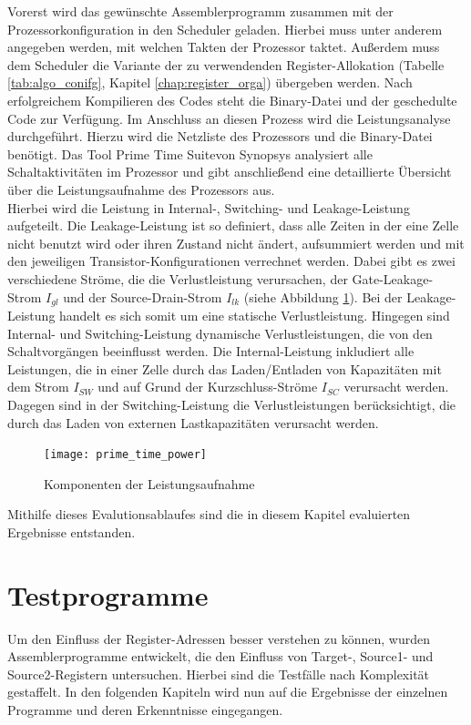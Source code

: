 Vorerst wird das gewünschte Assemblerprogramm zusammen mit der Prozessorkonfiguration in den Scheduler geladen. Hierbei muss unter anderem angegeben werden, mit welchen Takten der Prozessor taktet. Außerdem muss dem Scheduler die Variante der zu verwendenden Register-Allokation (Tabelle \ref{tab:algo_conifg}, Kapitel \ref{chap:register_orga}) übergeben werden. Nach erfolgreichem Kompilieren des Codes steht die Binary-Datei und der geschedulte Code zur Verfügung. Im Anschluss an diesen Prozess wird die Leistungsanalyse durchgeführt. Hierzu wird die Netzliste des Prozessors und die Binary-Datei benötigt. Das Tool \glqq Prime Time Suite\grqq{ }von Synopsys analysiert alle Schaltaktivitäten im Prozessor und gibt anschließend eine detaillierte Übersicht über die Leistungsaufnahme des Prozessors aus.\\
Hierbei wird die Leistung in Internal-, Switching- und Leakage-Leistung aufgeteilt. Die Leakage-Leistung ist so definiert, dass alle Zeiten in der eine Zelle nicht benutzt wird oder ihren Zustand nicht ändert, aufsummiert werden und mit den jeweiligen Transistor-Konfigurationen verrechnet werden. Dabei gibt es zwei verschiedene Ströme, die die Verlustleistung verursachen, der Gate-Leakage-Strom $I_{gl}$ und der Source-Drain-Strom $I_{lk}$ (siehe Abbildung \ref{fig:prime_time_power}). Bei der Leakage-Leistung handelt es sich somit um eine statische Verlustleistung. Hingegen sind Internal- und Switching-Leistung dynamische Verlustleistungen, die von den Schaltvorgängen beeinflusst werden. Die Internal-Leistung inkludiert alle Leistungen, die in einer Zelle durch das Laden/Entladen von Kapazitäten mit dem Strom $I_{SW}$ und auf Grund der Kurzschluss-Ströme $I_{SC}$ verursacht werden. Dagegen sind in der Switching-Leistung die Verlustleistungen berücksichtigt, die durch das Laden von externen Lastkapazitäten verursacht werden.\cite{primeTime2016}
\begin{figure}[H] 
	\centering
	\texttt{[image: prime\_time\_power]}
	\caption[Komponenten der Leistungsaufnahme]{Komponenten der Leistungsaufnahme \cite{primeTime2016}}
	\label{fig:prime_time_power}
\end{figure}
Mithilfe dieses Evalutionsablaufes sind die in diesem Kapitel evaluierten Ergebnisse entstanden.
\section{Testprogramme}
Um den Einfluss der Register-Adressen besser verstehen zu können, wurden Assemblerprogramme entwickelt, die den Einfluss von Target-, Source1- und Source2-Registern untersuchen. Hierbei sind die Testfälle nach Komplexität gestaffelt. In den folgenden Kapiteln wird nun auf die Ergebnisse der einzelnen Programme und deren Erkenntnisse eingegangen.
